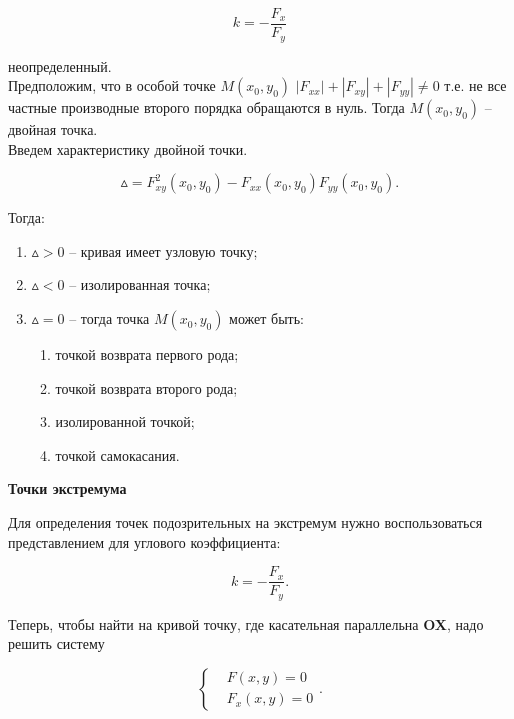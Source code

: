 \[
k = - \frac{F_{x}}{F_{y}}
\]

неопределенный.\\

Предположим, что в особой точке $M \left( x_{0}, y_{0} \right)$ $\left| F_{xx} \right| + \left| F_{xy} \right| + \left| F_{yy} \right| \neq 0$ т.е. не все частные производные второго порядка обращаются в нуль. Тогда $M \left( x_{0}, y_{0} \right)$ -- двойная точка.\\

Введем характеристику двойной точки.

\[
\vartriangle = F^{2}_{xy} \left( x_{0}, y_{0} \right) - F_{xx} \left( x_{0}, y_{0} \right) F_{yy} \left( x_{0}, y_{0} \right).
\]

Тогда:

\begin{enumerate}
	\item $\vartriangle > 0$ -- кривая имеет узловую точку;
	
	\item $\vartriangle < 0$ -- изолированная точка;
	
	\item $\vartriangle = 0$ -- тогда точка $M \left( x_{0}, y_{0} \right)$ может быть:
	
	\begin{enumerate}
		\item точкой возврата первого рода;
		
		\item точкой возврата второго рода;
		
		\item изолированной точкой;
		
		\item точкой самокасания. 
	\end{enumerate}
\end{enumerate}

\textbf{Точки экстремума}

Для определения точек подозрительных на экстремум нужно  воспользоваться представлением для углового коэффициента:

\[
k = - \frac{F_{x}}{F_{y}}.
\]

Теперь, чтобы найти на кривой точку, где касательная параллельна \textbf{OX}, надо решить систему

\[
\begin{cases}
& F \left( x, y \right) = 0\\
& F_{x} \left( x, y \right) = 0
\end{cases}.
\]

